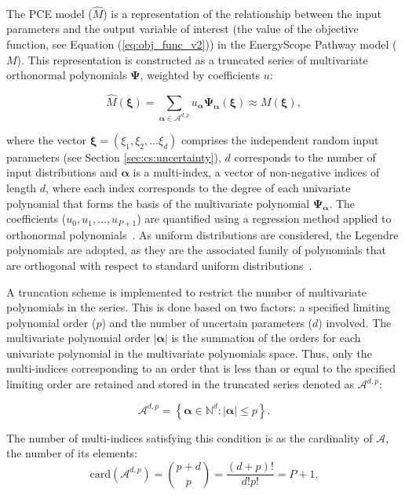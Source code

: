 \\

\noindent
The PCE model ($\hat{M}$) is a representation of the relationship between the input parameters and the output variable of interest (\ie the value of the objective function, see Equation (\ref{eq:obj_func_v2})) in the EnergyScope Pathway model ($M$). This representation is constructed as a truncated series of multivariate orthonormal polynomials $\bm{\Psi}$, weighted by coefficients $u$:

\begin{equation}
\hat{M} \left( \bm{\xi} \right) = \sum_{\bm{\alpha} \in \mathcal{A}^{d,p}} u_{\bm{\alpha}} \bm{\Psi}_{\bm{\alpha}} \left( \bm{\xi} \right) \approx M \left( \bm{\xi} \right), 
\end{equation}

\noindent where the vector $\bm{\xi} = (\xi_1,\xi_2, \dots \xi_d)$ comprises the independent random input parameters (see Section \ref{sec:cs:uncertainty}), $d$ corresponds to the number of input distributions and $\bm{\alpha}$ is a multi-index, \ie a vector of non-negative indices of length $d$, where each index corresponds to the degree of each univariate polynomial that forms the basis of the multivariate polynomial $\bm{\Psi_{\bm{\alpha}}}$. The coefficients ($u_0, u_1, \dots, u_{P+1}$) are quantified using a regression method applied to orthonormal polynomials~\cite{Sudret2014}. As uniform distributions are considered, the Legendre polynomials are adopted, as they are the associated family of polynomials that are orthogonal with respect to standard uniform distributions~\cite{Sudret2014}.

A truncation scheme is implemented to restrict the number of multivariate polynomials in the series. This is done based on two factors: a specified limiting polynomial order ($p$) and the number of uncertain parameters ($d$) involved. The multivariate polynomial order $|\bm{\alpha}|$ is the summation of the orders for each univariate polynomial in the multivariate polynomials space. Thus, only the multi-indices corresponding to an order that is less than or equal to the specified limiting order are retained and stored in the truncated series denoted as $\mathcal{A}^{d,p}$:

\begin{equation}
\mathcal{A}^{d,p} = \left \{ \bm{\alpha} \in \mathbb{N}^d : |\bm{\alpha}| \leq p \right \}. 
\end{equation}

The number of multi-indices satisfying this condition is as the cardinality of $\mathcal{A}$, \ie the number of its elements:
\begin{equation}
\mathrm{card} \left( \mathcal{A}^{d,p} \right) = {p + d \choose p} = \dfrac{\left( d + p \right) !}{d! p!} = P + 1.
\label{eq:pce:nterms}
\end{equation}

